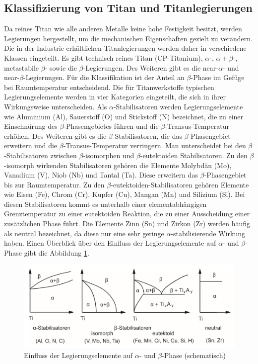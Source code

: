 \subsection{Klassifizierung von Titan und Titanlegierungen}

Da reines Titan wie alle anderen Metalle keine hohe Festigkeit besitzt, werden Legierungen hergestellt, um die mechanischen Eigenschaften gezielt zu verändern. Die in der Industrie erhältlichen Titanlegierungen werden daher in verschiedene Klassen eingeteilt. Es gibt technisch reines Titan (CP-Titanium), $\alpha$-, $\alpha+\beta$-, metastabile $\beta$- sowie die $\beta$-Legierungen. Des Weiteren gibt es die near-$\alpha$- und near-$\beta$-Legierungen. Für die Klassifikation ist der Anteil an $\beta$-Phase im Gefüge bei Raumtemperatur entscheidend.
Die für Titanwerkstoffe typischen Legierungselemente werden in vier Kategorien eingeteilt, die sich in ihrer Wirkungsweise unterscheiden. 
Als $\alpha$-Stabilisatoren werden Legierungselemente wie Aluminium (Al), Sauerstoff (O) und Stickstoff (N) bezeichnet, die zu einer Einschnürung des $\beta$-Phasengebietes führen und die $\beta$-Transus-Temperatur erhöhen.
Des Weiteren gibt es die $\beta$-Stabilisatoren, die das $\beta$-Phasengebiet erweitern und die $\beta$-Transus-Temperatur verringern. Man unterscheidet bei den $\beta$-Stabilisatoren zwischen $\beta$-isomorphen und $\beta$-eutektoiden Stabilisatoren. Zu den $\beta$-isomorph wirkenden Stabilisatoren gehören die Elemente Molybdän (Mo), Vanadium (V), Niob (Nb) und Tantal (Ta). Diese erweitern das $\beta$-Phasengebiet bis zur Raumtemperatur. 
Zu den $\beta$-eutektoiden-Stabilisatoren gehören Elemente wie Eisen (Fe), Chrom (Cr), Kupfer (Cu), Mangan (Mn) und Silizium (Si). Bei diesen Stabilisatoren kommt es unterhalb einer elementabhängigen Grenztemperatur zu einer eutektoiden Reaktion, die zu einer Ausscheidung einer zusätzlichen Phase führt. Die Elemente Zinn (Sn) und Zirkon (Zr) werden häufig als neutral bezeichnet, da diese nur eine sehr geringe $\alpha$-stabilisierende Wirkung haben. Einen Überblick über den Einfluss der Legierungselemente auf $\alpha$- und $\beta$-Phase gibt die Abbildung \ref{fig:tabelle-1}.

\begin{figure}[h]
	\centering
	\includegraphics[width=0.9\linewidth]{./Bilder/Tabelle 1.png}
	\caption{Einfluss der Legierungselemente auf $\alpha$- und $\beta$-Phase (schematisch) \cite{Lutjering.2007}}
	\label{fig:tabelle-1}
\end{figure}

